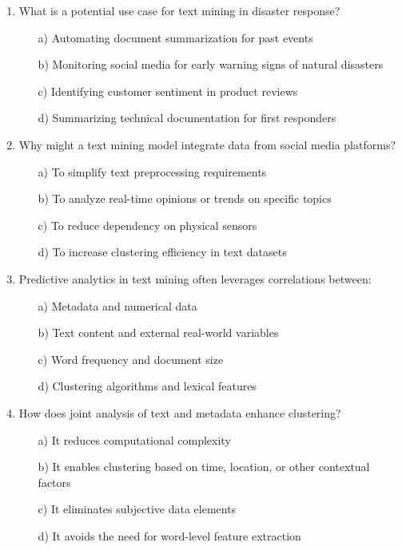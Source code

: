 \documentclass[8pt]{extarticle}
\begin{document}
\begin{multicols}{2}
\begin{enumerate}
\item What is a potential use case for text mining in disaster response?
\begin{itemize}
\item[a)] Automating document summarization for past events
\item[b)] Monitoring social media for early warning signs of natural disasters
\item[c)] Identifying customer sentiment in product reviews
\item[d)] Summarizing technical documentation for first responders
\end{itemize}

\item Why might a text mining model integrate data from social media platforms?
\begin{itemize}
\item[a)] To simplify text preprocessing requirements
\item[b)] To analyze real-time opinions or trends on specific topics
\item[c)] To reduce dependency on physical sensors
\item[d)] To increase clustering efficiency in text datasets
\end{itemize}

\item Predictive analytics in text mining often leverages correlations between:
\begin{itemize}
\item[a)] Metadata and numerical data
\item[b)] Text content and external real-world variables
\item[c)] Word frequency and document size
\item[d)] Clustering algorithms and lexical features
\end{itemize}

\item How does joint analysis of text and metadata enhance clustering?
\begin{itemize}
\item[a)] It reduces computational complexity
\item[b)] It enables clustering based on time, location, or other contextual factors
\item[c)] It eliminates subjective data elements
\item[d)] It avoids the need for word-level feature extraction
\end{itemize}


\end{enumerate}
\end{multicols}
\end{document}
